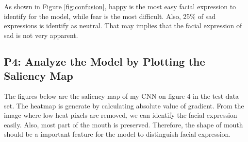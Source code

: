 \documentclass[fleqn,a4paper,12pt]{article}
\begin{document}
As shown in Figure \ref{fig:confusion}, happy is the most easy facial expression to identify for the model, while fear is the most difficult. Also, 25\% of sad expressions is identify as neutral. That may implies that the facial expression of sad is not very apparent. 

\subsection*{P4: Analyze the Model by Plotting the Saliency Map}

The figures below are the saliency map of my CNN on figure 4 in the test data set. The heatmap is generate by calculating absolute value of gradient. From the image where low heat pixels are removed, we can identify the facial expression easily. Also, most part of the mouth is preserved. Therefore, the shape of mouth should be a important feature for the model to distinguish facial expression.
\end{document}
